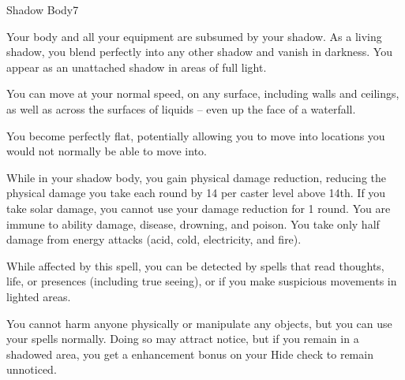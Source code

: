 \begin{spellsection}{Shadow Body}{7}
\begin{spellheader}
    \begin{spelltargetinginfo}
    \end{spelltargetinginfo}
\end{spellheader}
\begin{spellcontent}
    \begin{spelleffects}
        \spelleffect Your body and all your equipment are subsumed by your shadow. As a living shadow, you blend perfectly into any other shadow and vanish in darkness. You appear as an unattached shadow in areas of full light.
        \par You can move at your normal speed, on any surface, including walls and ceilings, as well as across the surfaces of liquids -- even up the face of a waterfall.
        \par You become perfectly flat, potentially allowing you to move into locations you would not normally be able to move into.
        \par While in your shadow body, you gain physical damage reduction, reducing the physical damage you take each round by 14  per caster level above 14th. If you take solar damage, you cannot use your damage reduction for 1 round. You are immune to ability damage, disease, drowning, and poison. You take only half damage from energy attacks (acid, cold, electricity, and fire).
        \par While affected by this spell, you can be detected by spells that read thoughts, life, or presences (including true seeing), or if you make suspicious movements in lighted areas.
        \par You cannot harm anyone physically or manipulate any objects, but you can use your spells normally. Doing so may attract notice, but if you remain in a shadowed area, you get a  enhancement bonus on your Hide check to remain unnoticed.
        \spelldur \durmed \dismissable
    \end{spelleffects}
\end{spellcontent}
\begin{spellfooter}
\end{spellfooter}
\end{spellsection}

